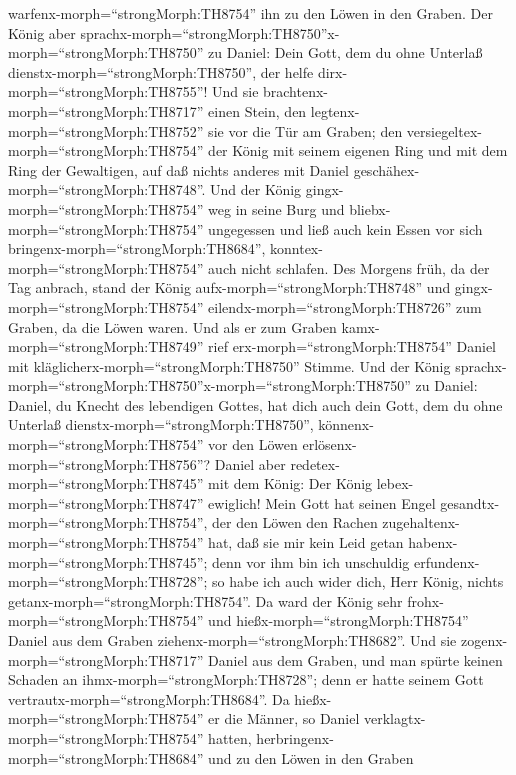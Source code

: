 warfenx-morph=``strongMorph:TH8754'' ihn zu den Löwen in den Graben. Der
König aber
sprachx-morph=``strongMorph:TH8750''x-morph=``strongMorph:TH8750'' zu
Daniel: Dein Gott, dem du ohne Unterlaß
dienstx-morph=``strongMorph:TH8750'', der helfe
dirx-morph=``strongMorph:TH8755''!  Und sie
brachtenx-morph=``strongMorph:TH8717'' einen Stein, den
legtenx-morph=``strongMorph:TH8752'' sie vor die Tür am Graben; den
versiegeltex-morph=``strongMorph:TH8754'' der König mit seinem eigenen
Ring und mit dem Ring der Gewaltigen, auf daß nichts anderes mit Daniel
geschähex-morph=``strongMorph:TH8748''.  Und der König
gingx-morph=``strongMorph:TH8754'' weg in seine Burg und
bliebx-morph=``strongMorph:TH8754'' ungegessen und ließ auch kein Essen
vor sich bringenx-morph=``strongMorph:TH8684'',
konntex-morph=``strongMorph:TH8754'' auch nicht schlafen. 
Des Morgens früh, da der Tag anbrach, stand der König
aufx-morph=``strongMorph:TH8748'' und gingx-morph=``strongMorph:TH8754''
eilendx-morph=``strongMorph:TH8726'' zum Graben, da die Löwen waren.
 Und als er zum Graben kamx-morph=``strongMorph:TH8749''
rief erx-morph=``strongMorph:TH8754'' Daniel mit
kläglicherx-morph=``strongMorph:TH8750'' Stimme. Und der König
sprachx-morph=``strongMorph:TH8750''x-morph=``strongMorph:TH8750'' zu
Daniel: Daniel, du Knecht des lebendigen Gottes, hat dich auch dein
Gott, dem du ohne Unterlaß dienstx-morph=``strongMorph:TH8750'',
könnenx-morph=``strongMorph:TH8754'' vor den Löwen
erlösenx-morph=``strongMorph:TH8756''?  Daniel aber
redetex-morph=``strongMorph:TH8745'' mit dem König: Der König
lebex-morph=``strongMorph:TH8747'' ewiglich!  Mein Gott hat
seinen Engel gesandtx-morph=``strongMorph:TH8754'', der den Löwen den
Rachen zugehaltenx-morph=``strongMorph:TH8754'' hat, daß sie mir kein
Leid getan habenx-morph=``strongMorph:TH8745''; denn vor ihm bin ich
unschuldig erfundenx-morph=``strongMorph:TH8728''; so habe ich auch
wider dich, Herr König, nichts getanx-morph=``strongMorph:TH8754''.
 Da ward der König sehr frohx-morph=``strongMorph:TH8754''
und hießx-morph=``strongMorph:TH8754'' Daniel aus dem Graben
ziehenx-morph=``strongMorph:TH8682''. Und sie
zogenx-morph=``strongMorph:TH8717'' Daniel aus dem Graben, und man
spürte keinen Schaden an ihmx-morph=``strongMorph:TH8728''; denn er
hatte seinem Gott vertrautx-morph=``strongMorph:TH8684''. 
Da hießx-morph=``strongMorph:TH8754'' er die Männer, so Daniel
verklagtx-morph=``strongMorph:TH8754'' hatten,
herbringenx-morph=``strongMorph:TH8684'' und zu den Löwen in den Graben
